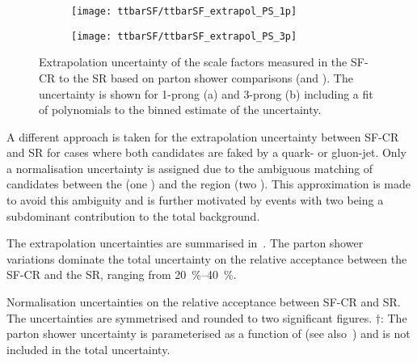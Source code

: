 \begin{figure}[htbp]
  \centering

  \begin{subfigure}[t]{.495\textwidth}
    \texttt{[image: ttbarSF/ttbarSF\_extrapol\_PS\_1p]}
    \caption{}
    \label{fig:ttbarSF_extrapol_shape_a}
  \end{subfigure}\hfill%
  \begin{subfigure}[t]{.495\textwidth}
    \texttt{[image: ttbarSF/ttbarSF\_extrapol\_PS\_3p]}
    \caption{}
    \label{fig:ttbarSF_extrapol_shape_b}
  \end{subfigure}

  \caption{Extrapolation uncertainty of the scale factors measured in
    the SF-CR to the \hadhad SR based on parton shower comparisons
    (\PYTHIA[8] and \HERWIG[7]). The uncertainty is shown for 1-prong
    (a) and 3-prong \faketauhadvis (b) including a fit of polynomials
    to the binned estimate of the uncertainty.}
  \label{fig:ttbarSF_extrapol_shape}
\end{figure}

A different approach is taken for the extrapolation uncertainty between SF-CR
and \hadhad SR for cases where both \tauhadvis candidates are faked by a quark-
or gluon-jet. Only a normalisation uncertainty is assigned due to the ambiguous
matching of \tauhadvis candidates between the \lephad (one \faketauhadvis) and
the \hadhad region (two \faketauhadvis). This approximation is made to avoid
this ambiguity and is further motivated by events with two \faketauhadvis being
a subdominant contribution to the total \ttbarFakes background.

The extrapolation uncertainties are summarised
in~. The parton shower variations
dominate the total uncertainty on the relative acceptance between the SF-CR and
the SR, ranging from \SIrange{20}{40}{\percent}.

\begin{table}[htbp]
  \centering

  \caption{Normalisation uncertainties on the relative acceptance
    between SF-CR and SR. The uncertainties are symmetrised and
    rounded to two significant figures. $\dagger$: The parton shower
    uncertainty is parameterised as a function of \tauhadvis \pT (see
    also~) and is not included in the
    total uncertainty.}%
  \label{tab:ttbarSF_acceptance_uncertainty}

  
\end{table}


